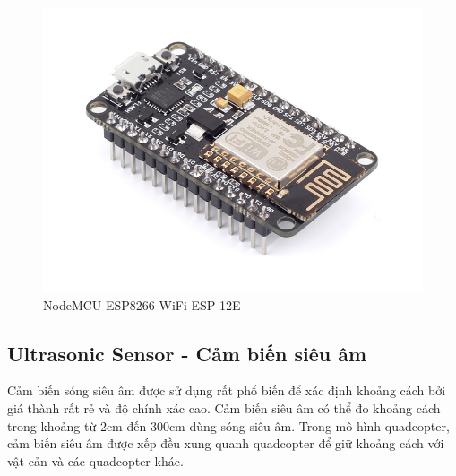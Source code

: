     \begin{figure}[h!]
    	\begin{center}
    		\includegraphics[scale=0.2]{images/esp8266.jpg}
    		\caption{NodeMCU ESP8266 WiFi ESP-12E}
    	\end{center}
    \end{figure}
    
    \subsection{Ultrasonic Sensor - Cảm biến siêu âm}
   Cảm biến sóng siêu âm được sử dụng rất phổ biến để xác định khoảng cách bởi giá thành rất rẻ và độ chính xác cao. Cảm biến siêu âm có thể đo khoảng cách trong khoảng từ 2cm đến 300cm dùng sóng siêu âm.
   Trong mô hình quadcopter, cảm biến siêu âm được xếp đều xung quanh quadcopter để giữ khoảng cách với vật cản và các quadcopter khác.
   
